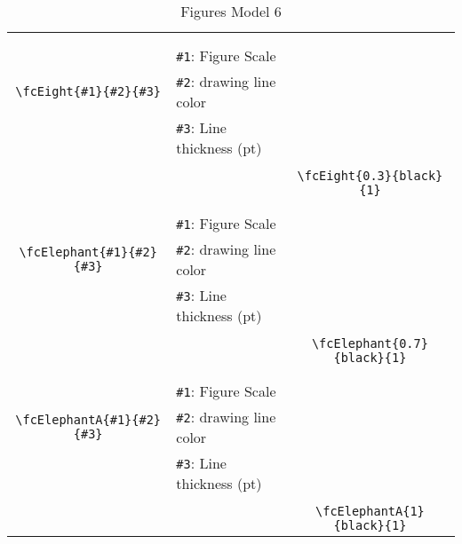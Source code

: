\documentclass{article}
\begin{document}
\begin{table}[H]
\begin{tabular}{|c|l|c|}
	&&\multirow{5}{*}{\fcEight{0.3}{black}{1}}\\	&&\\	&\verb|#1|: Figure Scale &\\	\verb|\fcEight{#1}{#2}{#3}|&	\verb|#2|: drawing line color &\\	&\verb|#3|: Line thickness (pt) &\\ &&\\&&	\verb|\fcEight{0.3}{black}{1}|\\\hline 	
	&&\multirow{5}{*}{\fcElephant{0.7}{black}{1}}\\	&&\\	&\verb|#1|: Figure Scale &\\	\verb|\fcElephant{#1}{#2}{#3}|&	\verb|#2|: drawing line color &\\	&\verb|#3|: Line thickness (pt) &\\ &&\\&&	\verb|\fcElephant{0.7}{black}{1}|\\\hline 	
	&&\multirow{5}{*}{\fcElephantA{1}{black}{1}}\\	&&\\	&\verb|#1|: Figure Scale &\\	\verb|\fcElephantA{#1}{#2}{#3}|&	\verb|#2|: drawing line color &\\	&\verb|#3|: Line thickness (pt) &\\ &&\\&&	\verb|\fcElephantA{1}{black}{1}|\\\hline 	\hline\end{tabular}\caption{Figures Model 6}\label{tab6}\end{table}
\end{document}
